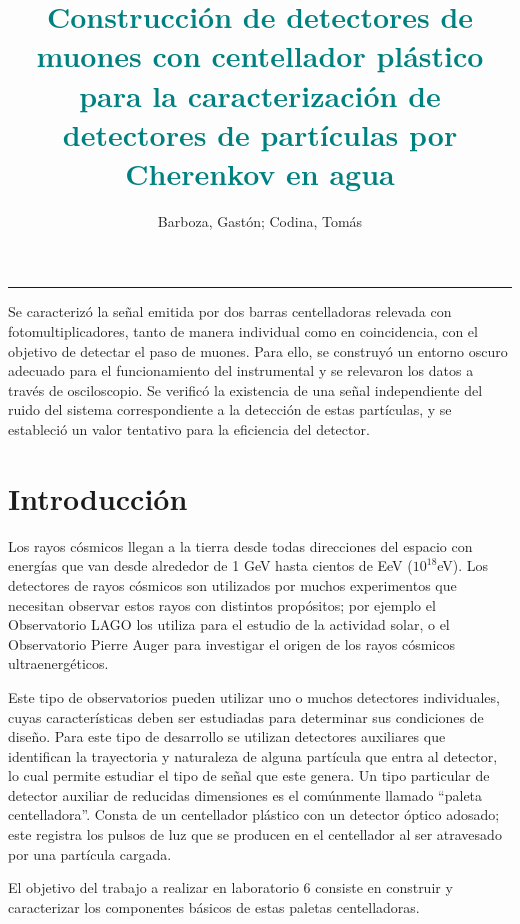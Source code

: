 \documentclass[12pt,a4paper]{article}
\title{\vspace{-40pt}\Large{\textbf{\textcolor{teal}{Construcción de detectores de muones con centellador plástico para la caracterización de detectores de partículas por Cherenkov en agua}}}}
\date{}
\author{\vspace{-.3cm}Barboza, Gastón; Codina, Tomás}
\affil{\vspace{-.3cm}Instituto de Astronomía y Física del Espacio}
\affil{\vspace{-.3cm}Laboratorio 6, Departamento de Física, FCEyN, UBA}
\affil{\vspace{-.3cm}barboza.gaston@gmail.com, tomycodina@gmail.com\vspace{.2cm}}
\numberwithin{equation}{section}
\begin{document}
\maketitle
\thispagestyle{lab}

\begin{center}
\vspace{-40pt}\rule{\textwidth}{0.2pt}
\end{center}

\small
\begin{boxumen}
Se caracterizó la señal emitida por dos barras centelladoras relevada con fotomultiplicadores, tanto de manera individual como en coincidencia, con el objetivo de detectar el paso de muones. Para ello, se construyó un entorno oscuro adecuado para el funcionamiento del instrumental y se relevaron los datos a través de osciloscopio. Se verificó la existencia de una señal independiente del ruido del sistema correspondiente a la detección de estas partículas, y se estableció un valor tentativo para la eficiencia del detector.
\end{boxumen}
\normalsize
\section{Introducción}

Los rayos cósmicos llegan a la tierra desde todas direcciones del espacio con energías que van desde alrededor de 1 GeV hasta cientos
de EeV ($10^{18}$eV). Los detectores de rayos cósmicos son utilizados por muchos experimentos que necesitan observar estos rayos con distintos propósitos; por ejemplo el Observatorio LAGO los utiliza para el estudio de la actividad solar, o el Observatorio Pierre Auger para investigar el origen de los rayos cósmicos ultraenergéticos.

Este tipo de observatorios pueden utilizar uno o muchos detectores individuales, cuyas características deben ser estudiadas para determinar sus condiciones de diseño. Para este tipo de desarrollo se utilizan detectores auxiliares que identifican la trayectoria y naturaleza de alguna partícula que entra al detector, lo cual permite estudiar el tipo de señal que este genera. Un tipo particular de detector auxiliar de reducidas dimensiones es el comúnmente llamado ``paleta centelladora''. Consta de un centellador plástico con un detector óptico adosado; este registra los pulsos de luz que se producen en el centellador al ser atravesado por una partícula cargada. 

El objetivo del trabajo a realizar en laboratorio 6 consiste en construir y caracterizar los componentes básicos de estas paletas centelladoras.
\end{document}
